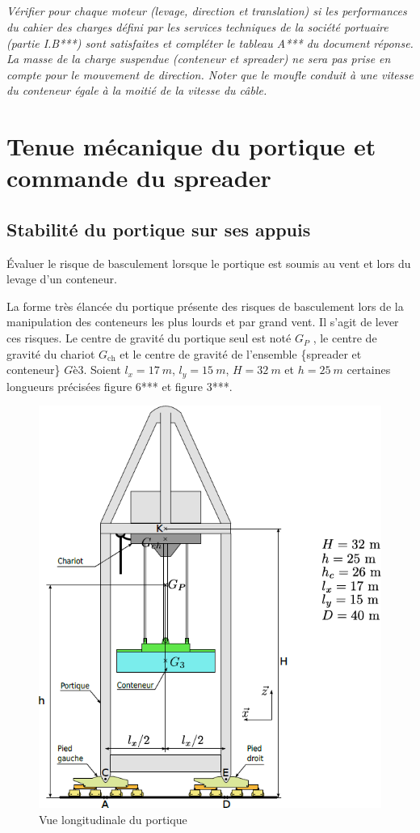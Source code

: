 \documentclass[10pt,fleqn]{article} %
\begin{document}
\subparagraph{\label{q02}}\textit{Vérifier pour chaque moteur (levage, direction et translation) si les performances du cahier des charges
défini par les services techniques de la société portuaire (partie I.B***) sont satisfaites et compléter le tableau A***
du document réponse. La masse de la charge suspendue (conteneur et spreader) ne sera pas prise en compte
pour le mouvement de direction. Noter que le moufle conduit à une vitesse du conteneur égale à la moitié de la
vitesse du câble.}

\section{Tenue mécanique du portique et commande du spreader}
\subsection{Stabilité du portique sur ses appuis}

\begin{obj}
Évaluer le risque de basculement lorsque le portique est soumis au vent et lors du levage d’un
conteneur.
\end{obj}

La forme très élancée du portique présente des risques de basculement lors de la manipulation des conteneurs
les plus lourds et par grand vent. Il s’agit de lever ces risques.
Le centre de gravité du portique seul est noté $G_P$ ,
le centre de gravité du chariot $G_{\text{ch}}$ et le centre
de gravité de l’ensemble \{spreader et conteneur\}
$Gè3$. Soient $l_x = \SI{17}{m}$, $l_y = \SI{15}{m}$, $H = \SI{32}{m}$ et
$h = \SI{25}{m}$ certaines longueurs précisées figure 6*** et
figure 3***.

\begin{figure}[H]
\centering
\includegraphics[width=.4\linewidth]{images/fig_06}
\caption{Vue longitudinale du portique \label{fig_06}}
\end{figure}
\end{document}
